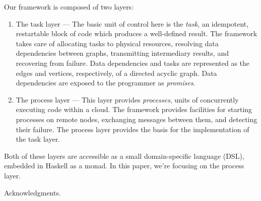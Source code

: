 \documentclass[preprint]{sigplanconf}
\begin{document}
Our framework is composed of two layers:

\begin{enumerate}
\item The task layer --- The basic unit of control here is the {\em task}, an idempotent, restartable block of code which produces a well-defined result. The framework takes care of allocating tasks to physical resources, resolving data dependencies between graphs, transmitting intermediary results, and recovering from failure. Data dependencies and tasks are represented as the edges and vertices, respectively, of a directed acyclic graph. Data dependencies are exposed to the programmer as {\em promises}.
\item The process layer --- This layer provides {\em processes}, units of concurrently executing code within a cloud. The framework provides facilities for starting processes on remote nodes, exchanging messages between them, and detecting their failure. The process layer provides the basis for the implementation of the task layer.
\end{enumerate}

Both of these layers are accessible as a small domain-specific language (DSL), embedded in Haskell as a monad. In this paper, we're focusing on the process layer.


\acks

Acknowledgments.





%
%
%
\end{document}
